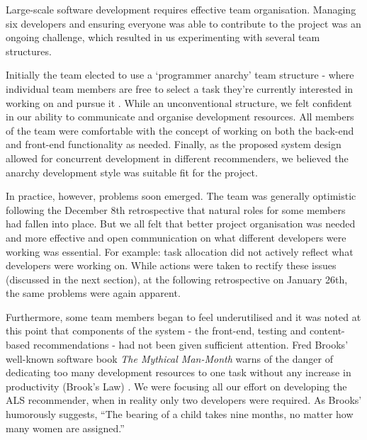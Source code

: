 \documentclass{l3proj}
\begin{document}



Large-scale software development requires effective team organisation. Managing six developers and ensuring everyone was able to contribute to the project was an ongoing challenge, which resulted in us experimenting with several team structures.

Initially the team elected to use a `programmer anarchy' team structure - where individual team members are free to select a task they’re currently interested in working on and pursue it \cite{ProgrammerAnarchy}. While an unconventional structure, we felt confident in our ability to communicate and organise development resources. All members of the team were comfortable with the concept of working on both the back-end and front-end functionality as needed. Finally, as the proposed system design allowed for concurrent development in different recommenders, we believed the anarchy development style was suitable fit for the project. 

In practice, however, problems soon emerged. The team was generally optimistic following the December 8th retrospective that natural roles for some members had fallen into place. But we all felt that better project organisation was needed and more effective and open communication on what different developers were working was essential. For example: task allocation did not actively reflect what developers were working on. While actions were taken to rectify these issues (discussed in the next section), at the following retrospective on January 26th, the same problems were again apparent. 

Furthermore, some team members began to feel underutilised and it was noted at this point that components of the system - the front-end, testing and content-based recommendations - had not been given sufficient attention. Fred Brooks' well-known software book \textit{The Mythical Man-Month} warns of the danger of dedicating too many development resources to one task without any increase in productivity (Brook’s Law) \cite{ManMonth}. We were focusing all our effort on developing the ALS recommender, when in reality only two developers were required. As Brooks’ humorously suggests, “The bearing of a child takes nine months, no matter how many women are assigned.”
\end{document}
